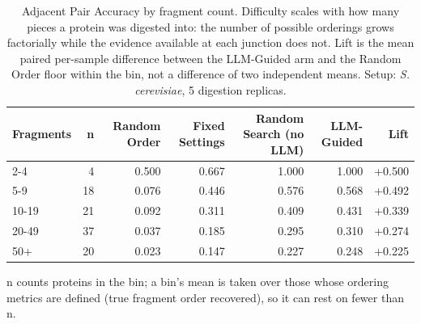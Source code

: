 \begin{table}[!tb]
  \centering
  \caption{Adjacent Pair Accuracy by fragment count. Difficulty scales with how many pieces a protein was digested into: the number of possible orderings grows factorially while the evidence available at each junction does not. Lift is the mean paired per-sample difference between the LLM-Guided arm and the Random Order floor within the bin, not a difference of two independent means. Setup: \textnormal{\textnormal{\textit{S. cerevisiae}}}, 5 digestion replicas.}
  \label{tab:stratification_yeast_r5}
  \begin{tabular}{lrrrrrr}
    \toprule
    Fragments & n & Random Order & Fixed Settings & Random Search (no LLM) & LLM-Guided & Lift \\
    \midrule
    2-4 & 4 & 0.500 & 0.667 & 1.000 & 1.000 & +0.500 \\
    5-9 & 18 & 0.076 & 0.446 & 0.576 & 0.568 & +0.492 \\
    10-19 & 21 & 0.092 & 0.311 & 0.409 & 0.431 & +0.339 \\
    20-49 & 37 & 0.037 & 0.185 & 0.295 & 0.310 & +0.274 \\
    50+ & 20 & 0.023 & 0.147 & 0.227 & 0.248 & +0.225 \\
    \bottomrule
  \end{tabular}
  \par\smallskip\footnotesize{n counts proteins in the bin; a bin's mean is taken over those whose ordering metrics are defined (true fragment order recovered), so it can rest on fewer than n.}
\end{table}
